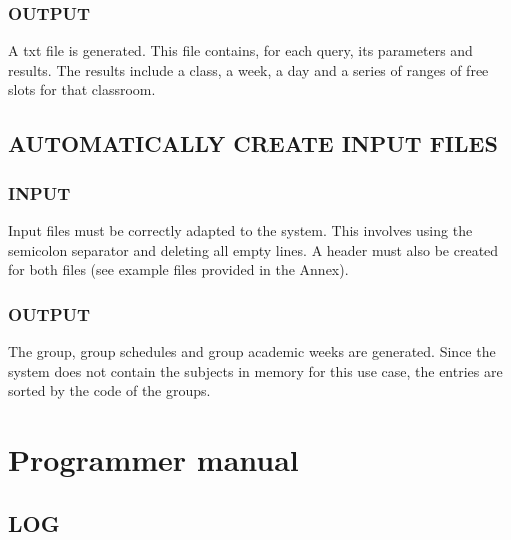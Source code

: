 \subsubsection*{OUTPUT}

A txt file is generated. This file contains, for each query, its parameters and results. The results include a class, a week, a day and a series of ranges of free slots for that classroom.



\subsection*{AUTOMATICALLY CREATE INPUT FILES}


\subsubsection*{INPUT}

Input files must be correctly adapted to the system. This involves using the semicolon separator and deleting all empty lines. A header must also be created for both files (see example files provided in the Annex).

\subsubsection*{OUTPUT}

The group, group schedules and group academic weeks are generated. Since the system does not contain the subjects in memory for this use case, the entries are sorted by the code of the groups.




\section{Programmer manual}


\subsection*{LOG}

